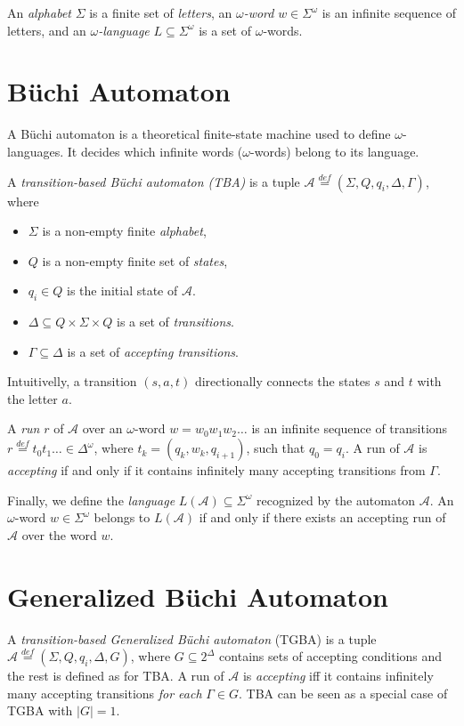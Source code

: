 \documentclass[
	digital
nolof, nolot
]{fithesis3}
\newcommand{\cA}{\mathcal{A}}
\newcommand{\lA}{L(\cA)}
\newcommand{\eqdef}{\overset{def}{=}}
\begin{document}
		
		An \emph{alphabet} $\Sigma$  is a finite set of \emph{letters}, an \emph{$\omega$-word} $w \in \Sigma^\omega$ is an infinite sequence of letters, and an \emph{$\omega$-language} $L \subseteq \Sigma^\omega$ is a set of $\omega$-words.
		\section{Büchi Automaton} \label{section:tba}
			A Büchi automaton is a theoretical finite-state machine used to define $\omega$-languages. It decides which infinite words ($\omega$-words) belong to its language.
			
			A \emph{transition-based Büchi automaton (TBA)} is a tuple $\cA\eqdef(\Sigma, Q, q_i, \Delta, \Gamma)$, where 
			\begin{itemize}
				\item $\Sigma$ is a non-empty finite \emph{alphabet},
				\item $Q$ is a non-empty finite set of \emph{states},
				\item $q_i \in Q$ is the initial state of $\cA$.
				\item $\Delta \subseteq Q \times \Sigma \times Q$ is a set of \emph{transitions}. 
				\item $\Gamma \subseteq \Delta$ is a set of \emph{accepting transitions}.
			\end{itemize}
			 Intuitivelly, a transition $(s, a, t)$  directionally connects the states $s$ and $t$ with the letter $a$.
			 
			A \emph{run} $r$ of $\cA$ over an $\omega$-word $w=w_0w_1w_2\ldots$ is an infinite sequence of transitions
			$r\eqdef t_0t_1\ldots\in\Delta^\omega$, where $t_k=(q_k, w_k,q_{i+1})$,
			 such that $q_0=q_i$.
			A run of $\cA$ is \emph{accepting} if and only if it contains infinitely many accepting transitions from $\Gamma$.

			Finally, we define the \emph{language} $\lA \subseteq \Sigma^\omega$ recognized by the automaton $\cA$. An $\omega$-word $w \in \Sigma^\omega$ belongs to $\lA$ if and only if there exists an accepting run of $\cA$ over the word $w$. 
			
			
		\section{Generalized Büchi Automaton}
		A \emph{transition-based Generalized Büchi automaton} (TGBA) is a tuple $\cA\eqdef(\Sigma, Q, q_i, \Delta, G)$, where $G \subseteq 2^\Delta$ contains sets of accepting conditions and the rest is defined as for TBA. A run of $\cA$ is \emph{accepting} iff it contains infinitely many accepting transitions \emph{for each} $\Gamma \in G$. TBA can be seen as a special case of TGBA with $|G|=1$.
		
\end{document}
